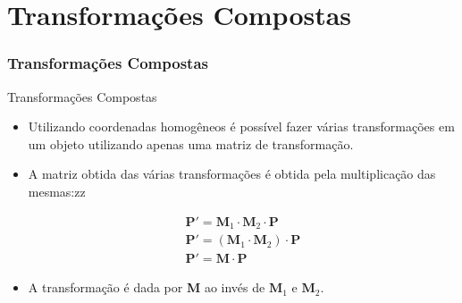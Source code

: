 \documentclass{beamer}
\begin{document}
\section{Transformações Compostas}
\begin{frame}
\frametitle{Transformações Compostas}
	\begin{block}{Transformações Compostas}
		\begin{itemize}
			\item Utilizando coordenadas homogêneos é possível fazer várias transformações em um objeto utilizando apenas uma matriz de transformação.
			\item A matriz obtida das várias transformações é obtida pela multiplicação das mesmas:zz
			
			\begin{eqnarray*}
				\textbf{P}' = \textbf{M}_1 \cdot \textbf{M}_2 \cdot \textbf{P} \\
				\textbf{P}' = ( \textbf{M}_1 \cdot \textbf{M}_2 ) \cdot \textbf{P} \\
				\textbf{P}' = \textbf{M} \cdot \textbf{P} 
			\end{eqnarray*}
				
		\item A transformação é dada por \textbf{M} ao invés de $\textbf{M}_1$ e $\textbf{M}_2$.
		\end{itemize}
	\end{block}
\end{frame}
\end{document}
